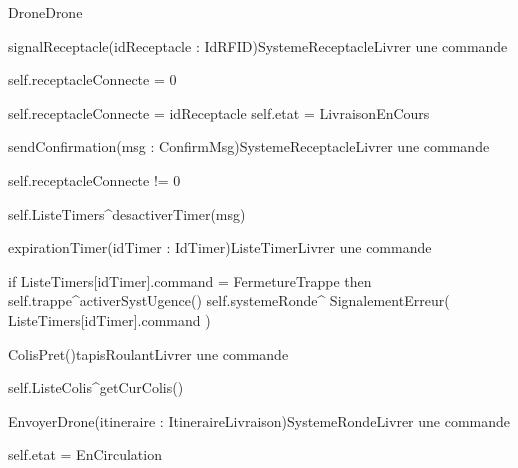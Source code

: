 \begin{OM}{Drone}{Drone}
    \begin{OMOperation}{signalReceptacle(idReceptacle : IdRFID)}{SystemeReceptacle}{Livrer une commande}
        \OMNoMessages
        \begin{OMPre}
            self.receptacleConnecte = 0
        \end{OMPre}
        \begin{OMPost}
            self.receptacleConnecte = idReceptacle
            self.etat = LivraisonEnCours
        \end{OMPost}
    \end{OMOperation}

    \begin{OMOperation}{sendConfirmation(msg : ConfirmMsg)}{SystemeReceptacle}{Livrer une commande}
        \begin{OMMessages}
        \end{OMMessages}
        \begin{OMPre}
            self.receptacleConnecte != 0
        \end{OMPre}
        \begin{OMPost}
            self.ListeTimers^desactiverTimer(msg)
        \end{OMPost}
    \end{OMOperation}

    \begin{OMOperation}{expirationTimer(idTimer : IdTimer)}{ListeTimer}{Livrer une commande}
        \begin{OMMessages}
        \end{OMMessages}
        \OMNoPre
        \begin{OMPost}
            if ListeTimers[idTimer].command = FermetureTrappe then
            self.trappe^activerSystUgence()
            self.systemeRonde^ SignalementErreur( ListeTimers[idTimer].command )
        \end{OMPost}
    \end{OMOperation}

    \begin{OMOperation}{ColisPret()}{tapisRoulant}{Livrer une commande}
        \begin{OMMessages}
        \end{OMMessages}
        \begin{OMPre}
        \end{OMPre}
        \begin{OMPost}
            self.ListeColis^getCurColis()
        \end{OMPost}
    \end{OMOperation}

    \begin{OMOperation}{EnvoyerDrone(itineraire : ItineraireLivraison)}{SystemeRonde}{Livrer une commande}
        \OMNoMessages
        \OMNoPre
        \begin{OMPost}
            self.etat = EnCirculation
        \end{OMPost}
    \end{OMOperation}
\end{OM}

